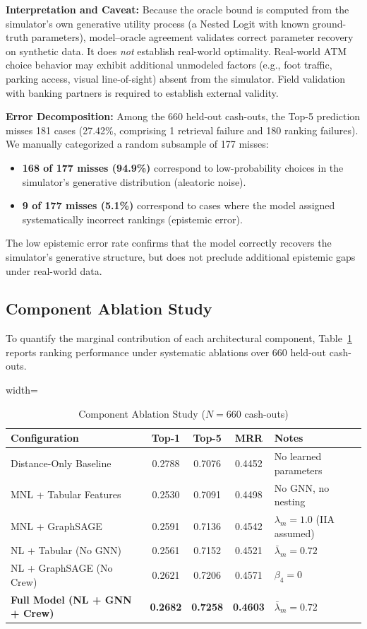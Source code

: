 \documentclass[conference]{IEEEtran}
\begin{document}
\textbf{Interpretation and Caveat:} Because the oracle bound is computed from the simulator's own generative utility process (a Nested Logit with known ground-truth parameters), model--oracle agreement validates correct parameter recovery on synthetic data. It does \textit{not} establish real-world optimality. Real-world ATM choice behavior may exhibit additional unmodeled factors (e.g., foot traffic, parking access, visual line-of-sight) absent from the simulator. Field validation with banking partners is required to establish external validity.

\textbf{Error Decomposition:} Among the 660 held-out cash-outs, the Top-5 prediction misses 181 cases (27.42\%, comprising 1 retrieval failure and 180 ranking failures). We manually categorized a random subsample of 177 misses:
\begin{itemize}
    \item \textbf{168 of 177 misses (94.9\%)} correspond to low-probability choices in the simulator's generative distribution (aleatoric noise).
    \item \textbf{9 of 177 misses (5.1\%)} correspond to cases where the model assigned systematically incorrect rankings (epistemic error).
\end{itemize}
The low epistemic error rate confirms that the model correctly recovers the simulator's generative structure, but does not preclude additional epistemic gaps under real-world data.

\subsection{Component Ablation Study}
To quantify the marginal contribution of each architectural component, Table~\ref{tab:ablation} reports ranking performance under systematic ablations over 660 held-out cash-outs.

\begin{table}[htbp]
\caption{Component Ablation Study ($N=660$ cash-outs)}
\label{tab:ablation}
\centering
\begin{adjustbox}{width=\columnwidth}
\begin{tabular}{lcccl}
\toprule
\textbf{Configuration} & \textbf{Top-1} & \textbf{Top-5} & \textbf{MRR} & \textbf{Notes} \\
\midrule
Distance-Only Baseline & 0.2788 & 0.7076 & 0.4452 & No learned parameters \\
MNL + Tabular Features & 0.2530 & 0.7091 & 0.4498 & No GNN, no nesting \\
MNL + GraphSAGE & 0.2591 & 0.7136 & 0.4542 & $\lambda_m = 1.0$ (IIA assumed) \\
NL + Tabular (No GNN) & 0.2561 & 0.7152 & 0.4521 & $\bar{\lambda}_m = 0.72$ \\
NL + GraphSAGE (No Crew) & 0.2621 & 0.7206 & 0.4571 & $\beta_4 = 0$ \\
\textbf{Full Model (NL + GNN + Crew)} & \textbf{0.2682} & \textbf{0.7258} & \textbf{0.4603} & $\bar{\lambda}_m = 0.72$ \\
\bottomrule
\end{tabular}
\end{adjustbox}
\end{table}
\end{document}
